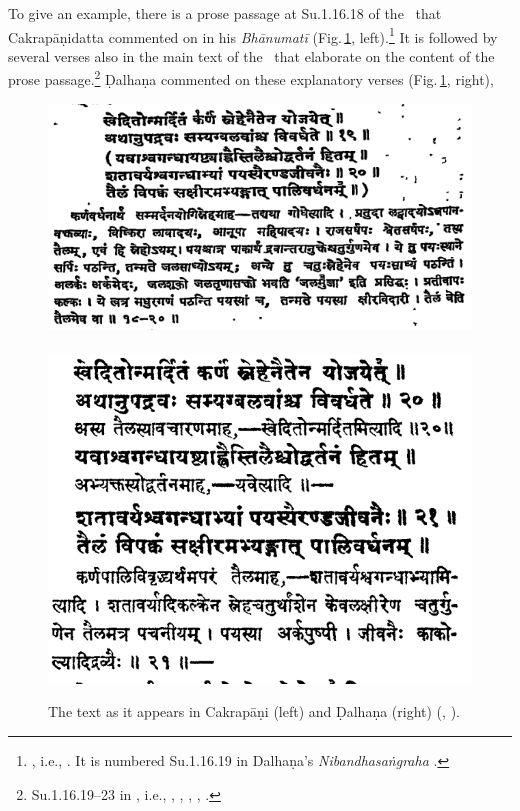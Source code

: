 To give an example, there is a prose passage at Su.1.16.18 of the \SS\ that
Cakrapāṇidatta commented on in his
\emph{Bhānumatī} (Fig.\,\ref{fig:yavasva}, left).\footnote{\cite[130]{acar-1939}, i.e.,
. It is numbered
Su.1.16.19 in Dalhaṇa's \emph{Nibandhasaṅgraha} \citep[79]{vulgate}.} It is
followed by several verses also in the main text  of the \SS\ that elaborate on
the content of the prose passage.\footnote{Su.1.16.19--23 in \cite{acar-1939},
i.e., , , , , .} 
%
Ḍalhaṇa commented on these explanatory verses (Fig.\,\ref{fig:yavasva}, right), 
\begin{figure}[t]
    \centering
    \includegraphics[width=.58\textwidth]{media/yavasva-cakra}\
    \includegraphics[width=.41\textwidth]{media/yavasva-dalhana}
    \caption{The text as it appears in Cakrapāṇi (left) and Ḍalhaṇa (right)  
    (\cite[130]{acar-1939}, \cite[79]{vulgate}).}
    \label{fig:yavasva}
\end{figure}
